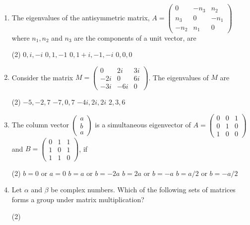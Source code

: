 \begin{enumerate}
\begin{tasks}
	\end{tasks}
	\item The eigenvalues of the antisymmetric matrix, $A=\left(\begin{array}{ccc}0 & -n_{3} & n_{2} \\ n_{3} & 0 & -n_{1} \\ -n_{2} & n_{1} & 0\end{array}\right)$ where $n_{1}, n_{2}$ and $n_{3}$ are the components of a unit vector, are
	 \begin{tasks}(2)
		\task[\textbf{a.}]$0, i,-i$
		\task[\textbf{b.}]$0,1,-1$
		\task[\textbf{c.}]$0,1+i,-1,-i$
		\task[\textbf{d.}] $0,0,0$
	\end{tasks}
	\item Consider the matrix $M=\left(\begin{array}{ccc}0 & 2 i & 3 i \\ -2 i & 0 & 6 i \\ -3 i & -6 i & 0\end{array}\right)$. The eigenvalues of $M$ are
	 \begin{tasks}(2)
		\task[\textbf{a.}]$-5,-2,7$
		\task[\textbf{b.}]$-7,0,7$
		\task[\textbf{c.}]$-4 i, 2 i, 2 i$
		\task[\textbf{d.}] $2,3,6$
	\end{tasks}
	\item The column vector $\left(\begin{array}{l}a \\ b \\ a\end{array}\right)$ is a simultaneous eigenvector of
	$A=\left(\begin{array}{lll}0 & 0 & 1 \\ 0 & 1 & 0 \\ 1 & 0 & 0\end{array}\right)$ and $B=\left(\begin{array}{lll}0 & 1 & 1 \\ 1 & 0 & 1 \\ 1 & 1 & 0\end{array}\right)$, if
	 \begin{tasks}(2)
		\task[\textbf{a.}] $b=0$ or $a=0$
		\task[\textbf{b.}] $b=a$ or $b=-2 a$
		\task[\textbf{c.}] $b=2 a$ or $b=-a$
		\task[\textbf{d.}]  $b=a / 2$ or $b=-a / 2$
	\end{tasks}
\item Let $\alpha$ and $\beta$ be complex numbers. Which of the following sets of matrices forms a group under matrix multiplication?
	 \begin{tasks}(2)

\end{tasks}
\end{enumerate}

